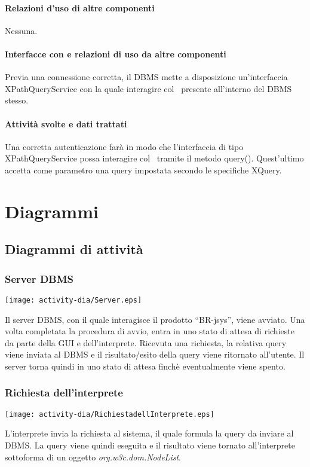 \subsubsection{Relazioni d'uso di altre componenti}
Nessuna.
\subsubsection{Interfacce con e relazioni di uso da altre componenti}
Previa una connessione corretta, il DBMS mette a disposizione un'interfaccia XPathQueryService con la quale interagire col \rp\ presente all'interno del DBMS stesso.
\subsubsection{Attivit\`a svolte e dati trattati}
Una corretta autenticazione far\`a in modo che l'interfaccia di tipo XPathQueryService possa interagire col \rp\ tramite il metodo query(). Quest'ultimo accetta come parametro una query impostata secondo le specifiche XQuery.

\chapter{Diagrammi}
\section{Diagrammi di attivit\`a}


\subsection{Server DBMS}
\begin{center}
 \texttt{[image: activity-dia/Server.eps]}
\end{center}
Il server DBMS, con il quale interagisce il prodotto ``BR-jsys'', viene avviato. Una volta completata la procedura di avvio, entra in uno stato di attesa di richieste da parte della GUI e dell'interprete. Ricevuta una richiesta, la relativa query viene inviata al DBMS e il risultato/esito della query viene ritornato all'utente. Il server torna quindi in uno stato di attesa finch\`e eventualmente viene spento.

\subsection{Richiesta dell'interprete}
\begin{center}
 \texttt{[image: activity-dia/RichiestadellInterprete.eps]}
\end{center}
L'interprete invia la richiesta al sistema, il quale formula la query da inviare al DBMS. La query viene quindi eseguita e il risultato viene tornato all'interprete sottoforma di un oggetto \textit{org.w3c.dom.NodeList}.


